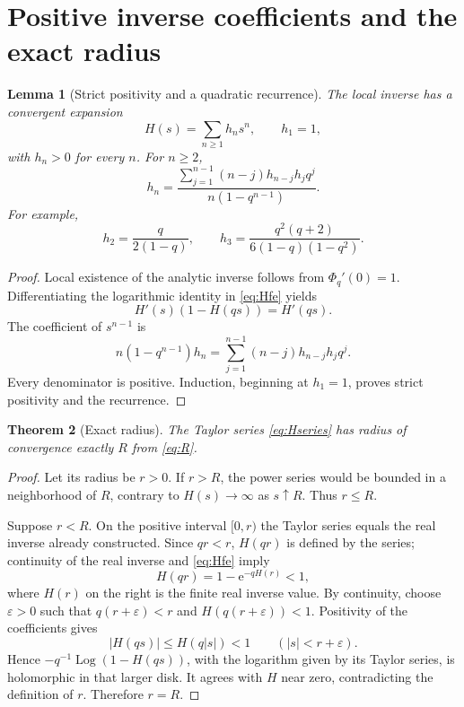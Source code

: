 \documentclass[11pt,letterpaper]{article}
\newtheorem{theorem}{Theorem}[section]
\newtheorem{lemma}[theorem]{Lemma}
\theoremstyle{definition}\newtheorem{definition}[theorem]{Definition}
\theoremstyle{remark}\newtheorem{remark}[theorem]{Remark}
\newcommand{\ee}{\mathrm e}
\newcommand{\Log}{\operatorname{Log}}
\newcommand{\PhiQ}{\Phi_q}
\numberwithin{equation}{section}
\begin{document}
\section{Positive inverse coefficients and the exact radius}\label{sec:positive}

\begin{lemma}[Strict positivity and a quadratic recurrence]\label{lem:coeff}
The local inverse has a convergent expansion
\begin{equation}\label{eq:Hseries}
 H(s)=\sum_{n\geq1}h_ns^n,\qquad h_1=1,
\end{equation}
with $h_n>0$ for every $n$. For $n\geq2$,
\begin{equation}\label{eq:hrec}
 h_n=\frac{\displaystyle\sum_{j=1}^{n-1}(n-j)h_{n-j}h_jq^j}
 {n(1-q^{n-1})}.
\end{equation}
For example,
\begin{equation}\label{eq:firstcoeff}
 h_2=\frac{q}{2(1-q)},\qquad
 h_3=\frac{q^2(q+2)}{6(1-q)(1-q^2)}.
\end{equation}
\end{lemma}

\begin{proof}
Local existence of the analytic inverse follows from $\PhiQ'(0)=1$. Differentiating the logarithmic identity in \eqref{eq:Hfe} yields
\[
 H'(s)(1-H(qs))=H'(qs).
\]
The coefficient of $s^{n-1}$ is
\[
 n(1-q^{n-1})h_n=\sum_{j=1}^{n-1}(n-j)h_{n-j}h_jq^j.
\]
Every denominator is positive. Induction, beginning at $h_1=1$, proves strict positivity and the recurrence.
\end{proof}

\begin{theorem}[Exact radius]\label{thm:radius}
The Taylor series \eqref{eq:Hseries} has radius of convergence exactly $R$ from \eqref{eq:R}.
\end{theorem}

\begin{proof}
Let its radius be $r>0$. If $r>R$, the power series would be bounded in a neighborhood of $R$, contrary to $H(s)\to\infty$ as $s\uparrow R$. Thus $r\leq R$.

Suppose $r<R$. On the positive interval $[0,r)$ the Taylor series equals the real inverse already constructed. Since $qr<r$, $H(qr)$ is defined by the series; continuity of the real inverse and \eqref{eq:Hfe} imply
\[
 H(qr)=1-\ee^{-qH(r)}<1,
\]
where $H(r)$ on the right is the finite real inverse value. By continuity, choose $\varepsilon>0$ such that $q(r+\varepsilon)<r$ and $H(q(r+\varepsilon))<1$. Positivity of the coefficients gives
\[
 |H(qs)|\leq H(q|s|)<1\qquad(|s|<r+\varepsilon).
\]
Hence $-q^{-1}\Log(1-H(qs))$, with the logarithm given by its Taylor series, is holomorphic in that larger disk. It agrees with $H$ near zero, contradicting the definition of $r$. Therefore $r=R$.
\end{proof}
\end{document}
